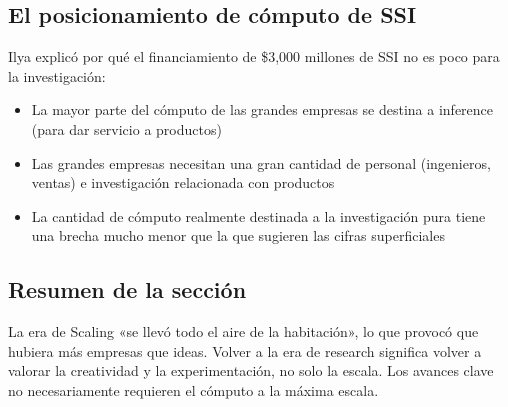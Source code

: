 \subsection{El posicionamiento de cómputo de SSI}

Ilya explicó por qué el financiamiento de \$3,000 millones de SSI no es poco para la investigación:
\begin{itemize}
    \item La mayor parte del cómputo de las grandes empresas se destina a inference (para dar servicio a productos)
    \item Las grandes empresas necesitan una gran cantidad de personal (ingenieros, ventas) e investigación relacionada con productos
    \item La cantidad de cómputo realmente destinada a la investigación pura tiene una brecha mucho menor que la que sugieren las cifras superficiales
\end{itemize}

\subsection{Resumen de la sección}

La era de Scaling «se llevó todo el aire de la habitación», lo que provocó que hubiera más empresas que ideas. Volver a la era de research significa volver a valorar la creatividad y la experimentación, no solo la escala. Los avances clave no necesariamente requieren el cómputo a la máxima escala.


